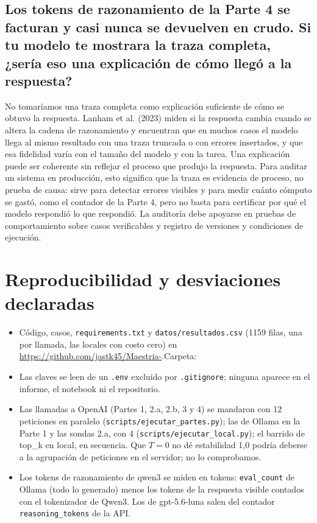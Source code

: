 \documentclass[runningheads]{llncs}
\begin{document}
\subsection{Los tokens de razonamiento de la Parte 4 se facturan y casi nunca se devuelven en crudo. Si tu modelo te mostrara la traza completa, ¿sería eso una explicación de cómo llegó a la respuesta?}
No tomaríamos una traza completa como explicación suficiente de cómo se obtuvo
la respuesta. Lanham et al. (2023) miden si la respuesta cambia cuando se
altera la cadena de razonamiento y encuentran que en muchos casos el modelo
llega al mismo resultado con una traza truncada o con errores insertados, y
que esa fidelidad varía con el tamaño del modelo y con la tarea. Una
explicación puede ser coherente sin reflejar el proceso que produjo la
respuesta. Para auditar un sistema en producción, esto significa que la traza
es evidencia de proceso, no prueba de causa: sirve para detectar errores
visibles y para medir cuánto cómputo se gastó, como el contador de la Parte 4,
pero no basta para certificar por qué el modelo respondió lo que respondió. La
auditoría debe apoyarse en pruebas de comportamiento sobre casos verificables y registro de versiones y condiciones de
ejecución.



\section{Reproducibilidad y desviaciones declaradas}
\begin{itemize}
\item Código, casos, \texttt{requirements.txt} y \texttt{datos/resultados.csv} (1159 filas, una por llamada, las locales con costo cero) en \url{https://github.com/jastk45/Maestria-}.\newline Carpeta: 
\item Las claves se leen de un \texttt{.env} excluido por \texttt{.gitignore}; ninguna aparece en el informe, el notebook ni el repositorio.
\item Las llamadas a OpenAI (Partes 1, 2.a, 2.b, 3 y 4) se mandaron con 12 peticiones en paralelo (\texttt{scripts/ejecutar\_partes.py}); las de Ollama en la Parte 1 y las sondas 2.a, con 4 (\texttt{scripts/ejecutar\_local.py}); el barrido de top\_k en local, en secuencia. Que $T=0$ no dé estabilidad 1,0 podría deberse a la agrupación de peticiones en el servidor; no lo comprobamos.
\item Los tokens de razonamiento de qwen3 se miden en tokens: \texttt{eval\_count} de Ollama (todo lo generado) menos los tokens de la respuesta visible contados con el tokenizador de Qwen3. Los de gpt-5.6-luna salen del contador \texttt{reasoning\_tokens} de la API.
\end{itemize}
\end{document}
